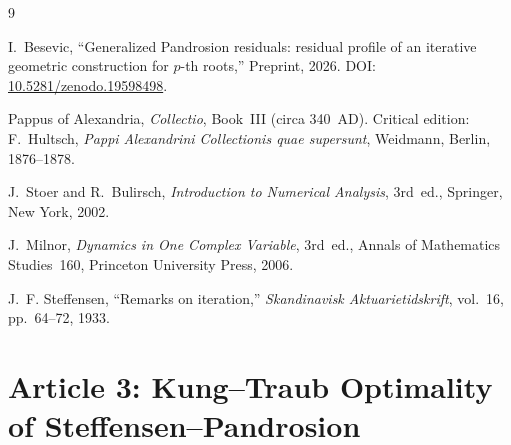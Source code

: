 \documentclass[10pt,a4paper,oneside]{book}
\theoremstyle{definition}
\theoremstyle{remark}
\begin{document}
\begin{thebibliography}{9}

I.~Besevic,
``Generalized Pandrosion residuals: residual profile of an iterative geometric construction for $p$-th roots,''
Preprint, 2026.
DOI: \href{https://doi.org/10.5281/zenodo.19598498}{10.5281/zenodo.19598498}.

Pappus of Alexandria,
\textit{Collectio}, Book~III (circa 340~AD).
Critical edition: F.~Hultsch, \textit{Pappi Alexandrini Collectionis quae supersunt},
Weidmann, Berlin, 1876--1878.

J.~Stoer and R.~Bulirsch,
\textit{Introduction to Numerical Analysis},
3rd~ed., Springer, New York, 2002.

J.~Milnor,
\textit{Dynamics in One Complex Variable},
3rd~ed., Annals of Mathematics Studies~160, Princeton University Press, 2006.

J.~F. Steffensen,
``Remarks on iteration,''
\textit{Skandinavisk Aktuarietidskrift}, vol.~16, pp.~64--72, 1933.

\end{thebibliography}





\chapter{Article 3: Kung--Traub Optimality of Steffensen--Pandrosion}
\graphicspath{{../}{../../figures/}{../smale/figures/}}
\end{document}
